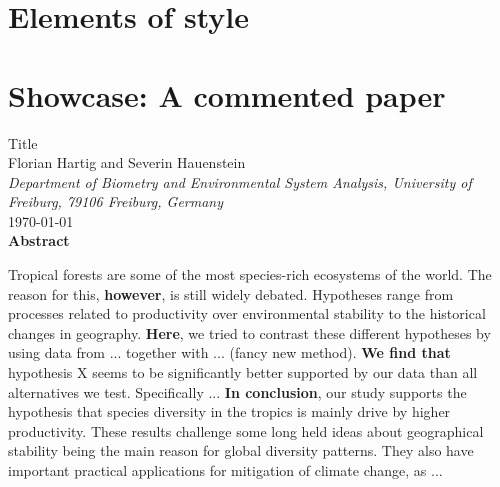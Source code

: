 \documentclass[justified, notoc]{tufte-book} %
\begin{document}
\chapter{Elements of style}


\chapter{Showcase: A commented paper}
\begin{center}
	\huge{Title} \\
	\vspace{0.3em}
	\large{Florian Hartig and Severin Hauenstein}\\
	\vspace{0.3em}
	\small{\textit{Department of Biometry and Environmental System Analysis, University of Freiburg, 79106 Freiburg, Germany}}\\
	\vspace{1em}
	\large{\today}\\
	\vspace{2em}
	\textbf{Abstract}\\
\end{center}
Tropical forests are some of the most species-rich ecosystems of the world.
The reason for this, \textbf{however}, is still widely debated. Hypotheses range from processes related to productivity over environmental stability to the historical changes in geography.
\textbf{Here}, we tried to contrast these different hypotheses by using data from ... together with ... (fancy new method).
\textbf{We find that} hypothesis X seems to be significantly better supported by our data
than all alternatives we test. Specifically ... 
\textbf{In conclusion}, our study supports the hypothesis that species diversity in the
tropics is mainly drive by higher productivity. These results challenge some long held
ideas about geographical stability being the main reason for global diversity
patterns. They also have important practical applications for mitigation of climate
change, as ...





\end{document}
